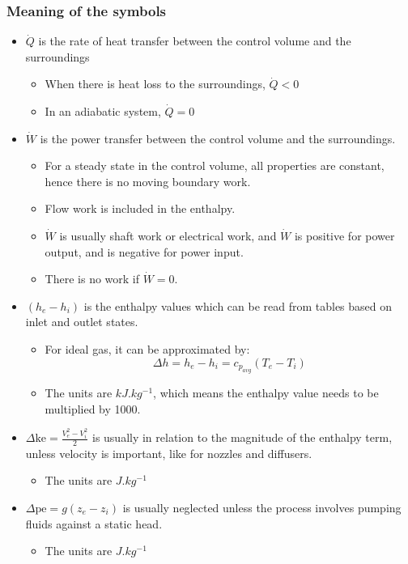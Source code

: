 \documentclass[11pt]{article}
\begin{document}
\newpage
\subsubsection{Meaning of the symbols}
\label{sec:orgfe34b92}
\begin{itemize}
\item \(\dot{Q}\) is the rate of heat transfer between the control volume and the surroundings
\begin{itemize}
\item When there is heat loss to the surroundings, \(\dot{Q} < 0\)
\item In an adiabatic system, \(\dot{Q} = 0\)
\end{itemize}

\item \(\dot{W}\) is the power transfer between the control volume and the surroundings.
\begin{itemize}
\item For a steady state in the control volume, all properties are constant, hence there is no moving boundary work.
\item Flow work is included in the enthalpy.
\item \(\dot{W}\) is usually shaft work or electrical work, and \(\dot{W}\) is positive for power output, and is negative for power input.
\item There is no work if \(\dot{W} = 0\).
\end{itemize}

\item \(\left(h_e - h_i \right)\) is the enthalpy values which can be read from tables based on inlet and outlet states.
\begin{itemize}
\item For ideal gas, it can be approximated by:
\[\Delta h = h_e - h_i = c_{p_{avg}} \left(T_e - T_i \right)\]

\item The units are \(\unit{kJ.kg^{-1}}\), which means the enthalpy value needs to be multiplied by 1000.
\end{itemize}

\item \(\Delta \text{ke} = \frac{V_e^2 - V_i^2}{2}\) is usually in relation to the magnitude of the enthalpy term, unless velocity is important, like for nozzles and diffusers.
\begin{itemize}
\item The units are \(\unit{J.kg^{-1}}\)
\end{itemize}

\item \(\Delta \text{pe} = g \left(z_e - z_i \right)\) is usually neglected unless the process involves pumping fluids against a static head.
\begin{itemize}
\item The units are \(\unit{J.kg^{-1}}\)
\end{itemize}
\end{itemize}
\end{document}
